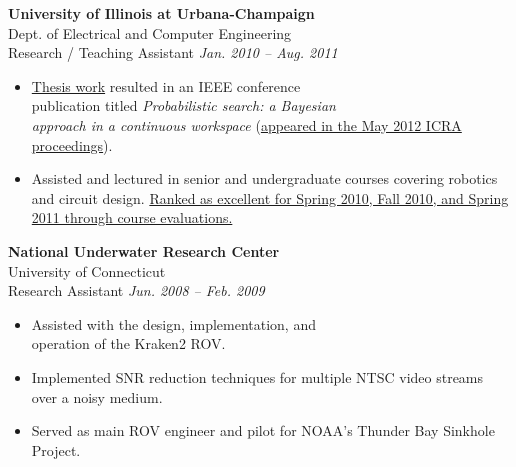 \documentclass[11pt,twoside,a4paper]{article}
\begin{document}
{\begin{multicols}{2}
                \textbf{University of Illinois at Urbana-Champaign}\\ 
                Dept. of Electrical and Computer Engineering\\
                Research / Teaching Assistant \hfill \textsl{Jan. 2010 -- Aug. 2011} \\
                \vspace{ -10px}
                \begin{itemize}[noitemsep,nolistsep]
            	 \item \href{https://www.ideals.illinois.edu/items/29847}{Thesis work} resulted in an IEEE conference \\publication titled \textsl{Probabilistic search: a Bayesian \\approach in a continuous workspace} (\href{https://ieeexplore.ieee.org/document/6224652}{appeared in the May 2012 ICRA proceedings}).  
                    \item Assisted and lectured in senior and undergraduate courses covering robotics and circuit design. \href{https://citl.illinois.edu/citl-101/measurement-evaluation/teaching-evaluation/teaching-evaluations-(ices)/teachers-ranked-as-excellent}{Ranked as excellent for Spring 2010, Fall 2010, and Spring 2011 through course evaluations.}
                \end{itemize}
                \vspace{10px}
                \textbf{National Underwater Research Center}\\ \hfill 
            	University of Connecticut\\ 
            	Research Assistant \hfill \textsl{Jun. 2008 -- Feb. 2009} \\
                \vspace{ -10px}
                \begin{itemize}[noitemsep,nolistsep]
                	\item Assisted with the design, implementation, and \\operation of the Kraken2 ROV.
                	\item Implemented SNR reduction techniques for multiple NTSC video streams over a noisy medium.
                	\item Served as main ROV engineer and pilot for NOAA's Thunder Bay Sinkhole Project. 
                \end{itemize}
                \vspace{5px}

\end{multicols}}
\end{document}
